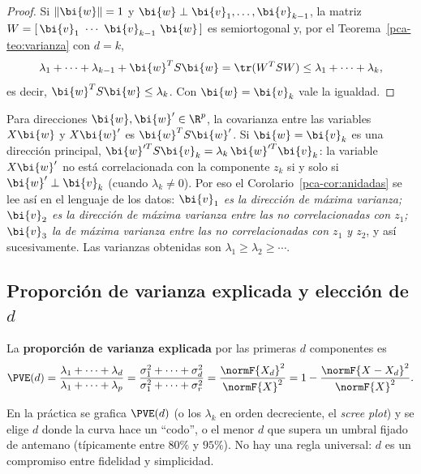 \begin{proof}
Si $\|\bi{w}\|=1$ y $\bi{w}\perp \bi{v}_1,\dots,\bi{v}_{k-1}$, la matriz
$W=[\,\bi{v}_1\ \cdots\ \bi{v}_{k-1}\ \bi{w}\,]$ es semiortogonal y, por el
Teorema~\ref{pca-teo:varianza} con $d=k$,
\[
\lambda_1+\dots+\lambda_{k-1}+\bi{w}^T S\bi{w}=\tr(W^T SW)\le\lambda_1+\dots+\lambda_k ,
\]
es decir, $\bi{w}^T S\bi{w}\le\lambda_k$. Con $\bi{w}=\bi{v}_k$ vale la igualdad.
\end{proof}

\begin{remark}
Para direcciones $\bi{w},\bi{w}'\in\R^p$, la covarianza entre las variables $X\bi{w}$ y
$X\bi{w}'$ es $\bi{w}^T S\bi{w}'$. Si $\bi{w}=\bi{v}_k$ es una dirección principal,
$\bi{w}'^T S\bi{v}_k=\lambda_k\,\bi{w}'^T \bi{v}_k$: la variable $X\bi{w}'$ no está
correlacionada con la componente $z_k$ si y solo si $\bi{w}'\perp \bi{v}_k$ (cuando
$\lambda_k\ne0$). Por eso el Corolario~\ref{pca-cor:anidadas} se lee así en el
lenguaje de los datos: \emph{$\bi{v}_1$ es la dirección de máxima varianza; $\bi{v}_2$
es la dirección de máxima varianza entre las no correlacionadas con $z_1$;
$\bi{v}_3$ la de máxima varianza entre las no correlacionadas con $z_1$ y $z_2$},
y así sucesivamente. Las varianzas obtenidas son
$\lambda_1\ge\lambda_2\ge\cdots$.
\end{remark}

\subsection{Proporción de varianza explicada y elección de \texorpdfstring{$d$}{d}}

\begin{definition}
La \textbf{proporción de varianza explicada} por las primeras $d$ componentes es
\[
\PVE(d)=\frac{\lambda_1+\dots+\lambda_d}{\lambda_1+\dots+\lambda_p}
=\frac{\sigma_1^2+\dots+\sigma_d^2}{\sigma_1^2+\dots+\sigma_r^2}
=\frac{\normF{X_d}^2}{\normF{X}^2}
=1-\frac{\normF{X-X_d}^2}{\normF{X}^2}.
\]
\end{definition}

En la práctica se grafica $\PVE(d)$ (o los $\lambda_k$ en orden decreciente,
el \emph{scree plot}) y se elige $d$ donde la curva hace un ``codo'', o el
menor $d$ que supera un umbral fijado de antemano (típicamente entre $80\%$ y
$95\%$). No hay una regla universal: $d$ es un compromiso entre fidelidad y
simplicidad.

